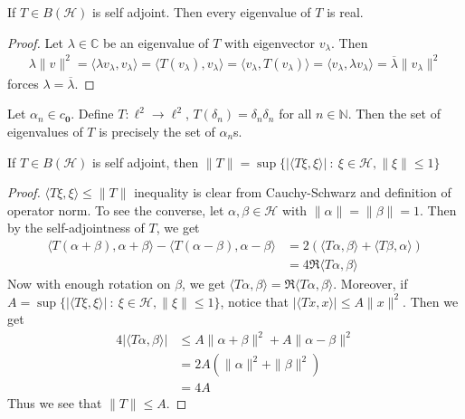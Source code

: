 

\begin{lemma}
  If $T \in B(\mathcal{H})$ is self adjoint. Then every eigenvalue of
  $T$ is real.
  \label{SelfAdjointOperatorsHaveRealEigenvals}
\end{lemma}
\begin{proof}
  Let $\lambda \in \mathbb{C}$ be an eigenvalue of $T$ with
  eigenvector $v_\lambda$. Then
  \begin{align*}
    \lambda \|v\|^2 = \langle \lambda v_\lambda ,  v_\lambda \rangle
    = \langle T(v_\lambda) ,   v_\lambda \rangle  = \langle v_\lambda
    ,  T(v_\lambda) \rangle  = \langle  v_\lambda ,  \lambda
    v_\lambda \rangle = \overline{\lambda}\|v_\lambda\|^2
  \end{align*}
  forces $\lambda =  \overline{\lambda}$.
\end{proof}

\begin{example}
  Let $\alpha_n \in c_{\textbf{0}}$. Define $T: \ell^2 \to \ell^2$,
  $T(\delta_n) = \delta_n \delta_n$ for all $ n \in \mathbb{N}$. Then
  the set of eigenvalues of $T$ is precisely the set of $\alpha_n$s.
\end{example}

\begin{lemma}
  \label{lem:spectrum_norm_self_adj}
  If $T \in B(\mathcal{H})$ is self adjoint, then $\|T\| =
  \sup\{|\langle T \xi ,  \xi \rangle| \ : \ \xi \in \mathcal{H},
  \|\xi\| \le 1\}$
\end{lemma}
\begin{proof}
  $\langle T \xi ,  \xi \rangle \le \|T\|$ inequality is clear from
  Cauchy-Schwarz and definition of operator norm.
  To see the converse, let $\alpha, \beta \in \mathcal{H}$ with $
  \|\alpha\| = \|\beta\| = 1$. Then by
  the self-adjointness of $T$, we get
  \begin{align*}
    \langle T(\alpha + \beta) , \alpha + \beta \rangle  - \langle
    T(\alpha - \beta) ,   \alpha - \beta \rangle  &= 2 (\langle  T
    \alpha ,  \beta \rangle + \langle T \beta ,  \alpha \rangle  ) \\
    &= 4 \Re \langle T \alpha ,  \beta \rangle
  \end{align*}
  Now with enough rotation on $\beta$, we get $\langle  T \alpha ,
  \beta \rangle = \Re \langle T \alpha ,  \beta \rangle $. Moreover, if $A
  = \sup\{|\langle T \xi ,  \xi \rangle| \ : \ \xi \in \mathcal{H},
  \|\xi\| \le 1\}$, notice that $|\langle Tx , x \rangle | \le A
  \|x\|^2$. Then we get
  \begin{align*}
    4 |\langle T \alpha ,  \beta \rangle | & \le A \|\alpha +
    \beta\|^2 + A \|\alpha - \beta\|^2 \\
    &=2 A(\|\alpha\|^2 + \|\beta\|^2) \\
    &=4 A
  \end{align*}
  Thus we see that $\|T\| \le A$.
\end{proof}

